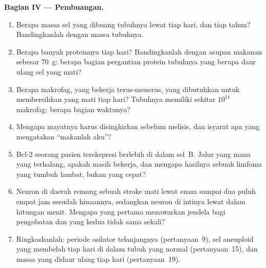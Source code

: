 \begin{problem}
\medskip
\noindent\textbf{Bagian IV --- Pembuangan.}
\begin{enumerate}[resume]
  \item Berapa massa sel yang dibuang tubuhnya lewat  tiap
        hari, dan tiap tahun? Bandingkanlah dengan massa tubuhnya.
  \item Berapa banyak proteinnya tiap hari? Bandingkanlah dengan asupan
        makanan sebesar \qty{70}{g}: berapa bagian pergantian protein
        tubuhnya yang berupa daur ulang sel yang mati?
  \item Berapa makrofag, yang bekerja terus-menerus, yang dibutuhkan untuk
        membersihkan yang mati tiap hari? Tubuhnya memiliki sekitar $10^{11}$
        makrofag: berapa bagian waktunya?
  \item Mengapa mayatnya harus disingkirkan sebelum melisis, dan isyarat apa
        yang mengatakan ``makanlah aku''?
  \item Bcl-2 seorang pasien terekspresi berlebih di dalam sel~B. Jalur yang
        mana yang terhalang, apakah  masih bekerja, dan
        mengapa hasilnya sebuah limfoma yang tumbuh lambat, bukan yang cepat?
  \item Neuron di daerah remang sebuah stroke mati lewat  enam
        sampai dua puluh empat jam sesudah hinaannya, sedangkan neuron di
        intinya lewat  dalam hitungan menit. Mengapa yang pertama
        menawarkan jendela bagi pengobatan dan yang kedua tidak sama sekali?
  \item Ringkaskanlah: periode osilator telanjangnya (pertanyaan~9),
        sel aneuploid yang membelah tiap hari di dalam tubuh yang normal
        (pertanyaan~15), dan massa yang didaur ulang  tiap hari
        (pertanyaan~19).
\end{enumerate}
\end{problem}
